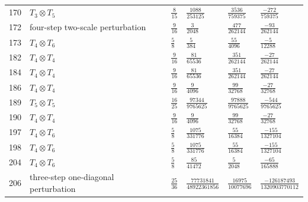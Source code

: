 \begin{landscape}
\begin{longtable}{r p{4.0cm} l p{4.1cm} p{4.1cm} p{4.8cm}}
170 & $T_{3}\otimes T_{5}$ & $\frac{8}{15}$ & $\frac{1088}{253125}$ & $\frac{3536}{759375}$ & $\frac{-272}{759375}$\\
172 & four-step two-scale perturbation & $\frac{9}{16}$ & $\frac{3}{2048}$ & $\frac{477}{262144}$ & $\frac{-93}{262144}$\\
173 & $T_{4}\otimes T_{6}$ & $\frac{5}{8}$ & $\frac{5}{384}$ & $\frac{55}{4096}$ & $\frac{-5}{12288}$\\
182 & $T_{4}\otimes T_{4}$ & $\frac{9}{16}$ & $\frac{81}{65536}$ & $\frac{351}{262144}$ & $\frac{-27}{262144}$\\
184 & $T_{4}\otimes T_{4}$ & $\frac{9}{16}$ & $\frac{81}{65536}$ & $\frac{351}{262144}$ & $\frac{-27}{262144}$\\
186 & $T_{4}\otimes T_{4}$ & $\frac{9}{16}$ & $\frac{9}{4096}$ & $\frac{99}{32768}$ & $\frac{-27}{32768}$\\
189 & $T_{5}\otimes T_{5}$ & $\frac{16}{25}$ & $\frac{97344}{9765625}$ & $\frac{97888}{9765625}$ & $\frac{-544}{9765625}$\\
190 & $T_{4}\otimes T_{4}$ & $\frac{9}{16}$ & $\frac{9}{4096}$ & $\frac{99}{32768}$ & $\frac{-27}{32768}$\\
197 & $T_{4}\otimes T_{6}$ & $\frac{5}{8}$ & $\frac{1075}{331776}$ & $\frac{55}{16384}$ & $\frac{-155}{1327104}$\\
198 & $T_{4}\otimes T_{6}$ & $\frac{5}{8}$ & $\frac{1075}{331776}$ & $\frac{55}{16384}$ & $\frac{-155}{1327104}$\\
204 & $T_{4}\otimes T_{6}$ & $\frac{5}{8}$ & $\frac{85}{41472}$ & $\frac{5}{2048}$ & $\frac{-65}{165888}$\\
206 & three-step one-diagonal perturbation & $\frac{25}{36}$ & $\frac{77731841}{48922361856}$ & $\frac{16975}{10077696}$ & $\frac{-126187493}{1320903770112}$\\
\end{longtable}
\end{landscape}
